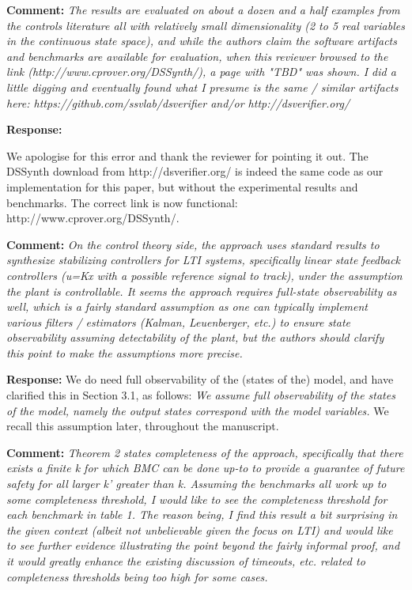 \documentclass{article}
\begin{document}
\vspace{2em}
{\bf Comment: } {\itshape The results are evaluated on about a dozen and a half examples from the controls literature all with relatively small
dimensionality (2 to 5 real variables in the continuous state space), and while the authors claim the software artifacts and benchmarks are available
for evaluation, when this reviewer browsed to the link (http://www.cprover.org/DSSynth/), a page with "TBD" was shown. I did a little digging and
eventually found what I presume is the same / similar artifacts here: https://github.com/ssvlab/dsverifier and/or http://dsverifier.org/}

\vspace{1em}
{\bf Response: }

We apologise for this error and thank the reviewer for pointing it out. The DSSynth download from http://dsverifier.org/ is indeed the same code 
as our implementation for this paper, but without the experimental results and benchmarks. The correct link is now functional: http://www.cprover.org/DSSynth/.


\vspace{2em}
{\bf Comment: } {\itshape On the control theory side, the approach uses standard results to synthesize stabilizing controllers for LTI systems,
specifically linear state feedback controllers (u=Kx with a possible reference signal to track), under the assumption the plant is controllable. It
seems the approach requires full-state observability as well, which is a fairly standard assumption as one can typically implement various filters /
estimators (Kalman, Leuenberger, etc.) to ensure state observability assuming detectability of the plant, but the authors should clarify this point to
make the assumptions more precise.}

\vspace{1em}
{\bf Response: }
We do need full observability of the (states of the) model, and have clarified this in Section 3.1, as follows: {\it We assume full observability of
the states of the model, namely the output states correspond with the model variables.  } We recall this assumption later, throughout the manuscript. 

\vspace{2em}
{\bf Comment: } {\itshape Theorem 2 states completeness of the approach, specifically that there exists a finite k for which BMC can be done up-to to
provide a guarantee of future safety for all larger k' greater than k. Assuming the benchmarks all work up to some completeness threshold, I would
like to see
the completeness threshold for each benchmark in table 1. The reason being, I find this result a bit surprising in the given context (albeit not
unbelievable given the focus on LTI) and would like to see further evidence illustrating the point beyond the fairly informal proof, and it would
greatly enhance the existing discussion of timeouts, etc. related to completeness thresholds being too high for some cases.}
\end{document}
